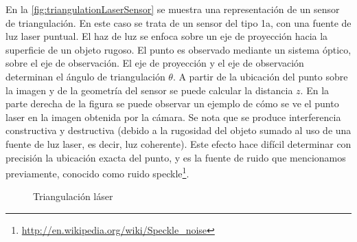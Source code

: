 En la \autoref{fig:triangulationLaserSensor} se muestra una representación de un sensor de triangulación. En este caso se trata de un sensor del tipo 1a, con una fuente de luz laser puntual. El haz de luz se enfoca sobre un eje de proyección hacia la superficie de un objeto rugoso. El punto es observado mediante un sistema óptico, sobre el eje de observación. El eje de proyección y el eje de observación determinan el ángulo de triangulación $\theta$. A partir de la ubicación del punto sobre la imagen y de la geometría del sensor se puede calcular la distancia $z$. 
En la parte derecha de la figura se puede observar un ejemplo de cómo se ve el punto laser en la imagen obtenida por la cámara. Se nota que se produce interferencia constructiva y destructiva (debido a la rugosidad del objeto sumado al uso de una fuente de luz laser, es decir, luz coherente). Este efecto hace difícil determinar con precisión la ubicación exacta del punto, y es la fuente de ruido que mencionamos previamente, conocido como ruido speckle\footnote{\url{http://en.wikipedia.org/wiki/Speckle_noise}}.


\begin{figure}[bth]
    \myfloatalign
        \myfloatalign
        \caption{Triangulación láser}
        \label{fig:triangulationLaserSensor}
\end{figure}


